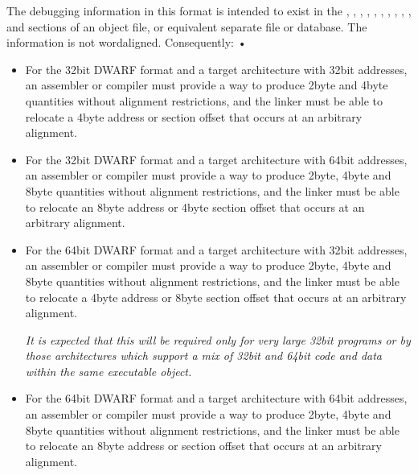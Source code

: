 The debugging information in this format is intended to
exist 
in 
the , 
, 
,
, 
, 
, 
,
, 
, 
, 
and 
sections of an object file, or equivalent
separate file or database. The information is not 
word\dash aligned. Consequently: •

\begin{itemize}
\item For the 32\dash bit DWARF format and a target architecture with
32\dash bit addresses, an assembler or compiler must provide a way
to produce 2\dash byte and 4\dash byte quantities without alignment
restrictions, and the linker must be able to relocate a
4\dash byte address or section offset that occurs at an arbitrary
alignment.

\item For the 32\dash bit DWARF format and a target architecture with
64\dash bit addresses, an assembler or compiler must provide a
way to produce 2\dash byte, 4\dash byte and 8\dash byte quantities without
alignment restrictions, and the linker must be able to relocate
an 8\dash byte address or 4\dash byte section offset that occurs at an
arbitrary alignment.

\item For the 64\dash bit DWARF format and a target architecture with
32\dash bit addresses, an assembler or compiler must provide a
way to produce 2\dash byte, 4\dash byte and 8\dash byte quantities without
alignment restrictions, and the linker must be able to relocate
a 4\dash byte address or 8\dash byte section offset that occurs at an
arbitrary alignment.

\textit{It is expected that this will be required only for very large
32\dash bit programs or by those architectures which support
a mix of 32\dash bit and 64\dash bit code and data within the same
executable object.}

\item For the 64\dash bit DWARF format and a target architecture with
64\dash bit addresses, an assembler or compiler must provide a
way to produce 2\dash byte, 4\dash byte and 8\dash byte quantities without
alignment restrictions, and the linker must be able to
relocate an 8\dash byte address or section offset that occurs at
an arbitrary alignment.
\end{itemize}

